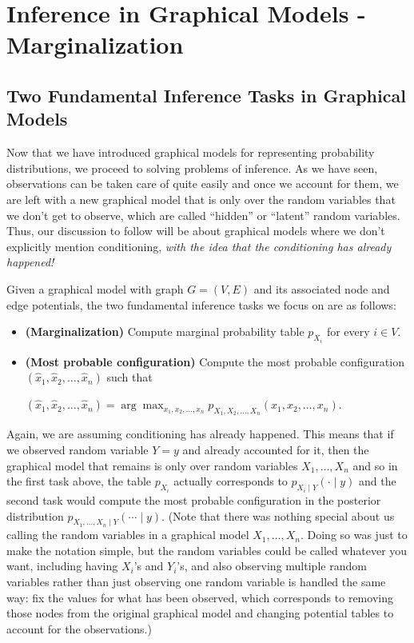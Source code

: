 \documentclass[6008notes.tex]{subfiles}
\begin{document}
\graphicspath{ {images/infgraph/} }

\section{Inference in Graphical Models - Marginalization}

\subsection{Two Fundamental Inference Tasks in Graphical Models}

Now that we have introduced graphical models for representing probability distributions, we proceed to solving problems of inference. As we have seen, observations can be taken care of quite easily and once we account for them, we are left with a new graphical model that is only over the random variables that we don't get to observe, which are called ``hidden'' or ``latent'' random variables. Thus, our discussion to follow will be about graphical models where we don't explicitly mention conditioning, \textit{with the idea that the conditioning has already happened!}

Given a graphical model with graph $G=(V,E)$ and its associated node and edge potentials, the two fundamental inference tasks we focus on are as follows:

\begin{itemize}
\item \textbf{(Marginalization)} Compute marginal probability table $p_{X_ i}$ for every $i \in V$.

\item \textbf{(Most probable configuration)} Compute the most probable configuration $(\widehat{x}_1, \widehat{x}_2, \dots , \widehat{x}_ n)$ such that

{\centering$(\widehat{x}_1, \widehat{x}_2, \dots , \widehat{x}_ n) = \arg \max _{x_1, x_2, \dots , x_ n} p_{X_1, X_2, \dots , X_ n}(x_1, x_2, \dots , x_ n).$ \par}
\end{itemize}
 
Again, we are assuming conditioning has already happened. This means that if we observed random variable $Y=y$ and already accounted for it, then the graphical model that remains is only over random variables $X_1, \dots ,X_n$ and so in the first task above, the table $p_{X_ i}$ actually corresponds to $p_{X_ i \mid Y}(\cdot \mid y)$ and the second task would compute the most probable configuration in the posterior distribution $p_{X_1, \dots , X_ n \mid Y}(\cdots \mid y)$. (Note that there was nothing special about us calling the random variables in a graphical model $X_1, \dots ,X_n$. Doing so was just to make the notation simple, but the random variables could be called whatever you want, including having $X_i$'s and $Y_i$'s, and also observing multiple random variables rather than just observing one random variable is handled the same way: fix the values for what has been observed, which corresponds to removing those nodes from the original graphical model and changing potential tables to account for the observations.)
\end{document}
